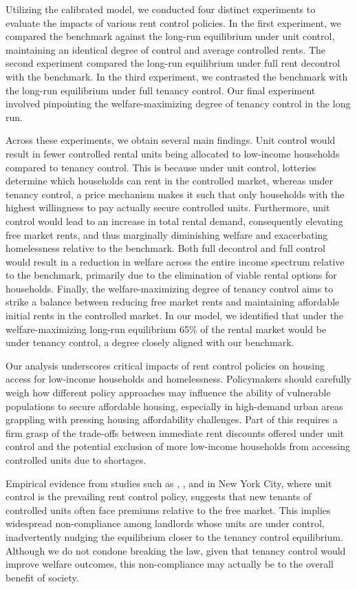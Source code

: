 \documentclass[parskip=full]{article}
\begin{document}
Utilizing the calibrated model, we conducted four distinct experiments to evaluate the impacts of various rent control policies. In the first experiment, we compared the benchmark against the long-run equilibrium under unit control, maintaining an identical degree of control and average controlled rents. The second experiment compared the long-run equilibrium under full rent decontrol with the benchmark. In the third experiment, we contrasted the benchmark with the long-run equilibrium under full tenancy control. Our final experiment involved pinpointing the welfare-maximizing degree of tenancy control in the long run.

Across these experiments, we obtain several main findings. Unit control would result in fewer controlled rental units being allocated to low-income households compared to tenancy control. This is because under unit control, lotteries determine which households can rent in the controlled market, whereas under tenancy control, a price mechanism makes it such that only households with the highest willingness to pay actually secure controlled units. Furthermore, unit control would lead to an increase in total rental demand, consequently elevating free market rents, and thus marginally diminishing welfare and exacerbating homelessness relative to the benchmark. Both full decontrol and full control would result in a reduction in welfare across the entire income spectrum relative to the benchmark, primarily due to the elimination of viable rental options for households. Finally, the welfare-maximizing degree of tenancy control aims to strike a balance between reducing free market rents and maintaining affordable initial rents in the controlled market. In our model, we identified that under the welfare-maximizing long-run equilibrium 65\% of the rental market would be under tenancy control, a degree closely aligned with our benchmark.

Our analysis underscores critical impacts of rent control policies on housing access for low-income households and homelessness. Policymakers should carefully weigh how different policy approaches may influence the ability of vulnerable populations to secure affordable housing, especially in high-demand urban areas grappling with pressing housing affordability challenges. Part of this requires a firm grasp of the trade-offs between immediate rent discounts offered under unit control and the potential exclusion of more low-income households from accessing controlled units due to shortages.

Empirical evidence from studies such as \citet{nagy-1997}, \citet{early-2000}, and \citet{cjq-2023} in New York City, where unit control is the prevailing rent control policy, suggests that new tenants of controlled units often face premiums relative to the free market. This implies widespread non-compliance among landlords whose units are under control, inadvertently nudging the equilibrium closer to the tenancy control equilibrium. Although we do not condone breaking the law, given that tenancy control would improve welfare outcomes, this non-compliance may actually be to the overall benefit of society.
\end{document}
